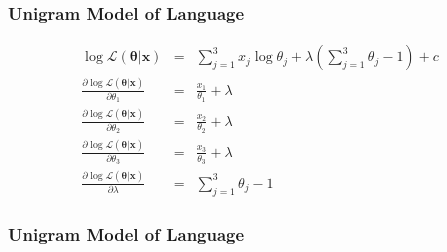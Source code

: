 \documentclass{beamer}
\numberwithin{equation}{section}
\begin{document}
\begin{frame}
\frametitle{Unigram Model of Language}

\begin{eqnarray}
\log \mathcal{L}(\boldsymbol{\theta}| \boldsymbol{x} ) & =  & \sum_{j=1}^{3} x_{j} \log \theta_{j} + \lambda(\sum_{j=1}^{3} \theta_{j} - 1)   + c \nonumber \\
\frac{\partial \log \mathcal{L}(\boldsymbol{\theta}| \boldsymbol{x} )}{\partial \theta_{1}} & = & \frac{x_{1}}{\theta_{1}} + \lambda \nonumber \\
\frac{\partial \log \mathcal{L}(\boldsymbol{\theta}| \boldsymbol{x} )}{\partial \theta_{2}} & = & \frac{x_{2}}{\theta_{2}} + \lambda \nonumber \\
\frac{\partial \log \mathcal{L}(\boldsymbol{\theta}| \boldsymbol{x} )}{\partial \theta_{3}} & = & \frac{x_{3}}{\theta_{3}} + \lambda \nonumber \\
\frac{\partial \log \mathcal{L}(\boldsymbol{\theta}| \boldsymbol{x} )}{\partial \lambda} & = & \sum_{j=1}^{3}\theta_{j} - 1 \nonumber 
\end{eqnarray}
\end{frame}


\begin{frame}
\frametitle{Unigram Model of Language}


\pause \pause 

\end{frame}
\end{document}
